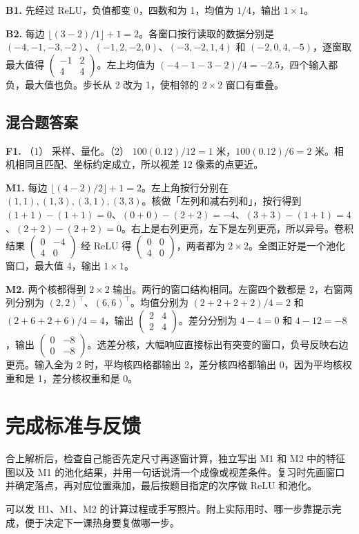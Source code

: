 \documentclass[UTF8,a4paper,11pt]{ctexart}
\begin{document}
\textbf{B1.} 先经过 ReLU，负值都变 0，四数和为 1，均值为 $1/4$，输出 $1\times1$。

\textbf{B2.} 每边 $\lfloor(3-2)/1\rfloor+1=2$。各窗口按行读取的数据分别是 $( -4,-1,-3,-2)$、$(-1,2,-2,0)$、$(-3,-2,1,4)$ 和 $(-2,0,4,-5)$，逐窗取最大值得 $\begin{pmatrix}-1&2\\4&4\end{pmatrix}$。左上均值为 $(-4-1-3-2)/4=-2.5$，四个输入都负，最大值也负。步长从 2 改为 1，使相邻的 $2\times2$ 窗口有重叠。

\clearpage
\subsection{混合题答案}
\textbf{F1.} （1） 采样、量化。（2） $100(0.12)/12=1$ 米，$100(0.12)/6=2$ 米。相机相同且匹配、坐标约定成立，所以视差 12 像素的点更近。

\textbf{M1.} 每边 $\lfloor(4-2)/2\rfloor+1=2$。左上角按行分别在 $(1,1),(1,3),(3,1),(3,3)$。核做「左列和减右列和」，按行得到 $(1+1)-(1+1)=0$、$(0+0)-(2+2)=-4$、$(3+3)-(1+1)=4$、$(2+2)-(2+2)=0$。右上是右列更亮，左下是左列更亮，所以异号。卷积结果 $\begin{pmatrix}0&-4\\4&0\end{pmatrix}$ 经 ReLU 得 $\begin{pmatrix}0&0\\4&0\end{pmatrix}$，两者都为 $2\times2$。全图正好是一个池化窗口，最大值 4，输出 $1\times1$。

\textbf{M2.} 两个核都得到 $2\times2$ 输出。两行的窗口结构相同。左窗四个数都是 2，右窗两列分别为 $(2,2)^\top$、$(6,6)^\top$。均值分别为 $(2+2+2+2)/4=2$ 和 $(2+6+2+6)/4=4$，输出 $\begin{pmatrix}2&4\\2&4\end{pmatrix}$。差分分别为 $4-4=0$ 和 $4-12=-8$，输出 $\begin{pmatrix}0&-8\\0&-8\end{pmatrix}$。选差分核，大幅响应直接标出有突变的窗口，负号反映右边更亮。输入全为 2 时，平均核四格都输出 2，差分核四格都输出 0，因为平均核权重和是 1，差分核权重和是 0。

\section{完成标准与反馈}
合上解析后，检查自己能否先定尺寸再逐窗计算，独立写出 M1 和 M2 中的特征图以及 M1 的池化结果，并用一句话说清一个成像或视差条件。复习时先画窗口并确定落点，再对应位置乘加，最后按题目指定的次序做 ReLU 和池化。

可以发 H1、M1、M2 的计算过程或手写照片。附上实际用时、哪一步靠提示完成，便于决定下一课热身要复做哪一步。
\end{document}
